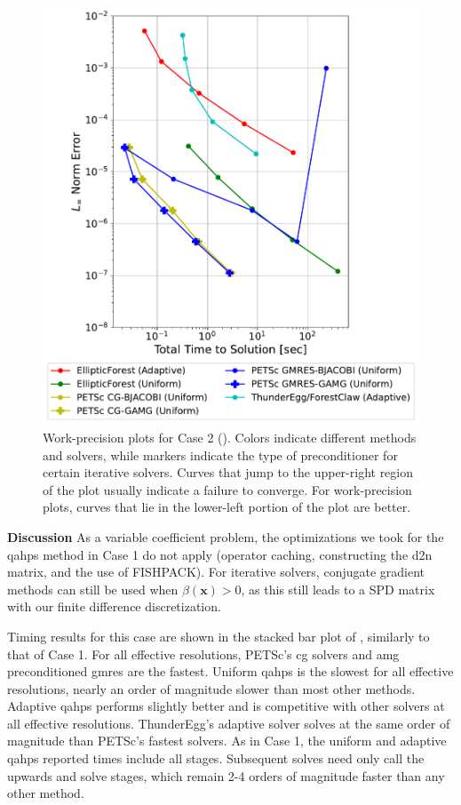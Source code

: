 \begin{figure}
    \centering
    \includegraphics[width=1.0\textwidth, clip=true, trim={0 0 0 0}]{figures/case02-work-precision-plots-no-title.pdf}
    \caption{Work-precision plots for Case 2 (). Colors indicate different methods and solvers, while markers indicate the type of preconditioner for certain iterative solvers. Curves that jump to the upper-right region of the plot usually indicate a failure to converge. For work-precision plots, curves that lie in the lower-left portion of the plot are better.}
    \label{fig:case02-work-precision-plot}
\end{figure}

{\bf Discussion}
As a variable coefficient problem, the optimizations we took for the \gls{qahps} method in Case 1 do not apply (operator caching, constructing the \gls{d2n} matrix, and the use of FISHPACK). For iterative solvers, conjugate gradient methods can still be used when $\beta(\textbf{x}) > 0$, as this still leads to a SPD matrix with our finite difference discretization.

Timing results for this case are shown in the stacked bar plot of , similarly to that of Case 1. For all effective resolutions, PETSc's \gls{cg} solvers and \gls{amg} preconditioned \gls{gmres} are the fastest. Uniform \gls{qahps} is the slowest for all effective resolutions, nearly an order of magnitude slower than most other methods. Adaptive \gls{qahps} performs slightly better and is competitive with other solvers at all effective resolutions. ThunderEgg's adaptive solver solves  at the same order of magnitude than PETSc's fastest solvers. As in Case 1, the uniform and adaptive \gls{qahps} reported times include all stages. Subsequent solves need only call the upwards and solve stages, which remain 2-4 orders of magnitude faster than any other method.

